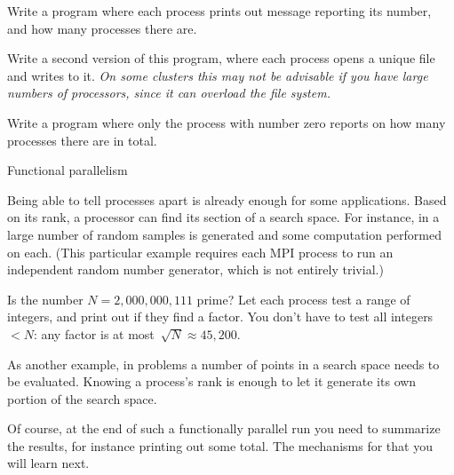 \begin{exercise}
  \label{ex:hello3}
  Write a program where each process prints out message
  reporting its number, and how many processes there are.

  Write a second version of this program, where each process opens a
  unique file and writes to it. \emph{On some clusters this may not be
    advisable if you have large numbers of processors, since it can
    overload the file system.}
\end{exercise}

\begin{exercise}
  \label{ex:hello4}
  Write a program where only the process with number zero
  reports on how many processes there are in total.
\end{exercise}

 {Functional parallelism}

Being able to tell processes apart is already enough for some applications.
Based on its rank, a processor can find its section of a search space.
For instance, in  a large number of random samples
is generated and some computation performed on each. (This particular example requires each MPI
process to run an independent random number generator, which is not entirely trivial.)

\begin{exercise}
  \label{ex:primetest}
  Is the number $N=2,000,000,111$ prime?  Let each process test a
  range of integers, and print out if they find a factor.  You don't
  have to test all integers~$<N$: any factor is at most~$\sqrt
  N\approx 45,200$.
\end{exercise}
As another example, in  problems
a number of points in a search space needs to be evaluated. Knowing
a process's rank is enough to let it generate its own portion of the search space.

Of course, at the end of such a functionally parallel run you need to
summarize the results, for instance printing out some total.
The mechanisms for that you will learn next.

%

